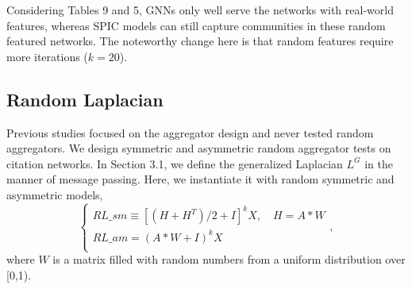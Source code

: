 \documentclass[preprint,11pt]{elsarticle}
\begin{document}
\begin{table}
\setlength{\abovecaptionskip}{0pt}
\setlength{\belowcaptionskip}{6pt}
  \caption{Test accuracy (\%) on random citation networks}
  \label{table-9}
  \centering
\end{table}
Considering Tables 9 and 5, GNNs only well serve the networks with real-world features, whereas SPIC models can still capture communities in these random featured networks. The noteworthy change here is that random features require more iterations ($k=20$).

\subsection{Random Laplacian}
Previous studies focused on the aggregator design and never tested random aggregators. We design  symmetric and asymmetric random aggregator tests on citation networks. In Section 3.1, we define the generalized Laplacian $L^G$ in the manner of message passing. Here, we instantiate it with random symmetric and asymmetric models, 
\begin{equation}
\left\{ 
\begin{array}{l}
RL\_sm \equiv [(H+H^T)/2 + I]^{k}X, \quad H=A*W \\
RL\_am = (A*W + I)^{k}X \\
\end{array}
\right.
,
\end{equation}
where $W$ is a matrix filled with random numbers from a uniform distribution over [0,1).
\end{document}
